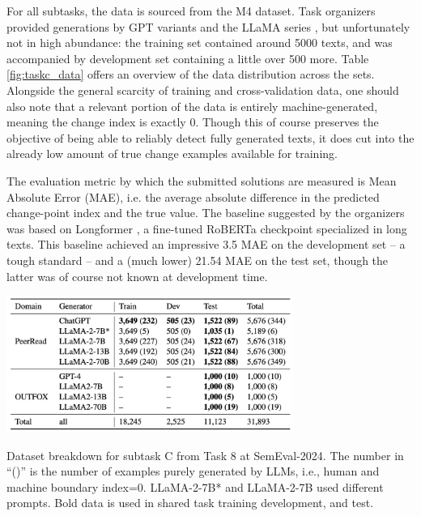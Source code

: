For all subtasks, the data is sourced from the M4 \citep{wang-etal-2024-m4} dataset.
Task organizers provided generations by GPT variants and the LLaMA series \citep{touvron2023llama}, but unfortunately not in high abundance: the training set contained around 5000 texts, and was accompanied by development set containing a little over 500 more.
Table \ref{fig:taskc_data} offers an overview of the data distribution across the sets.
Alongside the general scarcity of training and cross-validation data, one should also note that a relevant portion of the data is entirely machine-generated, meaning the change index is exactly 0.
Though this of course preserves the objective of being able to reliably detect fully generated texts, it does cut into the already low amount of true change examples available for training.

The evaluation metric by which the submitted solutions are measured is Mean Absolute Error (MAE), i.e. the average absolute difference in the predicted change-point index and the true value.
The baseline suggested by the organizers was based on Longformer \citep{beltagy2020longformerlongdocumenttransformer}, a fine-tuned RoBERTa checkpoint specialized in long texts.
This baseline achieved an impressive 3.5 MAE on the development set -- a tough standard -- and a (much lower) 21.54 MAE on the test set, though the latter was of course not known at development time.

\vspace{1cm}

\begin{table}[h]
    \centering
    \includegraphics[width=0.7\textwidth]{assets/subtaskc-data.png}
    \caption{
        Dataset breakdown for subtask C from Task 8 at SemEval-2024.
        The number in “()” is the number of examples purely generated by LLMs, i.e., human and machine boundary index=0.
        LLaMA-2-7B* and LLaMA-2-7B used different prompts. Bold data is used in shared task training development, and test.
    }
    \label{fig:taskc_data}
\end{table}


